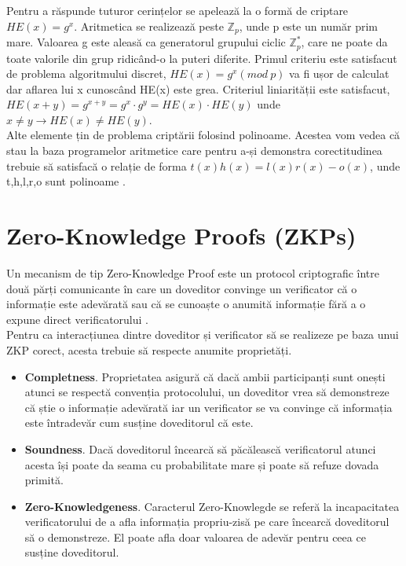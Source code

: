 Pentru a răspunde tuturor cerințelor se apelează la o formă de criptare $HE(x) = g^x$. Aritmetica se realizează peste $\mathbb{Z}_p$, unde p este un număr prim mare. Valoarea g este aleasă ca generatorul grupului ciclic $\mathbb{Z}^*_p$, care ne poate da toate valorile din grup ridicând-o la puteri diferite. Primul criteriu este satisfacut de problema algoritmului discret, $HE(x) = g^x (mod \ p)$ va fi ușor de calculat dar aflarea lui x cunoscând HE(x) este grea. Criteriul liniarității este satisfacut, $HE(x + y) = g^{x+y} = g^x \cdot g^y = HE(x) \cdot HE(y)$ unde $x \ne y \rightarrow HE(x) \ne HE(y)$.\\

Alte elemente țin de problema criptării folosind polinoame. Acestea vom vedea că stau la baza programelor aritmetice care pentru a-și demonstra corectitudinea trebuie să satisfacă o relație de forma $t(x)h(x) = l(x)r(x) - o(x)$, unde t,h,l,r,o sunt polinoame \cite{ZKS_Crypto_Basic2}.\\

\clearpage

\section{Zero-Knowledge Proofs (ZKPs)}

Un mecanism de tip Zero-Knowledge Proof este un protocol criptografic între două părți comunicante în care un doveditor convinge un verificator că o informație este adevărată sau că se cunoaște o anumită informație fără a o expune direct verificatorului \cite{ZKS_Crypto_Basic}.\\

Pentru ca interacțiunea dintre doveditor și verificator să se realizeze pe baza unui ZKP corect, acesta trebuie să respecte anumite proprietăți.
\begin{itemize}
    \item \textbf{Completness}. Proprietatea asigură că dacă ambii participanți sunt onești atunci se respectă convenția protocolului, un doveditor vrea să demonstreze că știe o informație adevărată iar un verificator se va convinge că informația este întradevăr cum susține doveditorul că este.
    \item \textbf{Soundness}. Dacă doveditorul încearcă să păcălească verificatorul atunci acesta își poate da seama cu probabilitate mare și poate să refuze dovada primită.
    \item \textbf{Zero-Knowledgeness}. Caracterul Zero-Knowlegde se referă la incapacitatea verificatorului de a afla informația propriu-zisă pe care încearcă doveditorul să o demonstreze. El poate afla doar valoarea de adevăr pentru ceea ce susține doveditorul.
\end{itemize}

